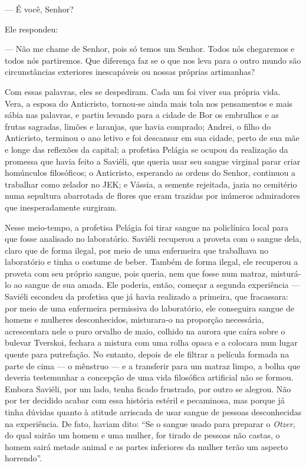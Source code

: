 --- É você, Senhor?

Ele respondeu:

--- Não me chame de Senhor, pois só temos um Senhor. Todos nós
chegaremos e todos nós partiremos. Que diferença faz se o que nos leva
para o outro mundo são circunstâncias exteriores inescapáveis ou nossas
próprias artimanhas?

Com essas palavras, eles se despediram. Cada um foi viver sua própria
vida. Vera, a esposa do Anticristo, tornou-se ainda mais tola nos
pensamentos e mais sábia nas palavras, e partiu levando para a cidade de
Bor os embrulhos e as frutas sagradas, limões e laranjas, que havia
comprado; Andrei, o filho do Anticristo, terminou o ano letivo e foi
descansar em sua cidade, perto de sua mãe e longe das reflexões da
capital; a profetisa Pelágia se ocupou da realização da promessa que
havia feito a Saviéli, que queria usar seu sangue virginal parar criar
homúnculos filosóficos; o Anticristo, esperando as ordens do Senhor,
continuou a trabalhar como zelador no JEK; e Vássia, a semente
rejeitada, jazia no cemitério numa sepultura abarrotada de flores que
eram trazidas por inúmeros admiradores que inesperadamente surgiram.

Nesse meio-tempo, a profetisa Pelágia foi tirar sangue na policlínica
local para que fosse analisado no laboratório. Saviéli recuperou a
proveta com o sangue dela, claro que de forma ilegal, por meio de uma
enfermeira que trabalhava no laboratório e tinha o costume de beber.
Também de forma ilegal, ele recuperou a proveta com seu próprio sangue,
pois queria, nem que fosse num matraz, misturá-lo ao sangue de sua
amada. Ele poderia, então, começar a segunda experiência --- Saviéli
escondeu da profetisa que já havia realizado a primeira, que fracassara:
por meio de uma enfermeira permissiva do laboratório, ele conseguira
sangue de homens e mulheres desconhecidos, misturara-o na proporção
necessária, acrescentara nele o puro orvalho de maio, colhido na aurora
que caíra sobre o bulevar Tverskoi, fechara a mistura com uma rolha
opaca e a colocara num lugar quente para putrefação. No entanto, depois
de ele filtrar a película formada na parte de cima --- o mênstruo --- e
a transferir para um matraz limpo, a bolha que deveria testemunhar a
concepção de uma vida filosófica artificial não se formou. Embora
Saviéli, por um lado, tenha ficado frustrado, por outro se alegrou. Não
por ter decidido acabar com essa história estéril e pecaminosa, mas
porque já tinha dúvidas quanto à atitude arriscada de usar sangue de
pessoas desconhecidas na experiência. De fato, haviam dito: ``Se o
sangue usado para preparar o \emph{Otzer}, do qual sairão um homem e uma
mulher, for tirado de pessoas não castas, o homem sairá metade animal e
as partes inferiores da mulher terão um aspecto horrendo''.

